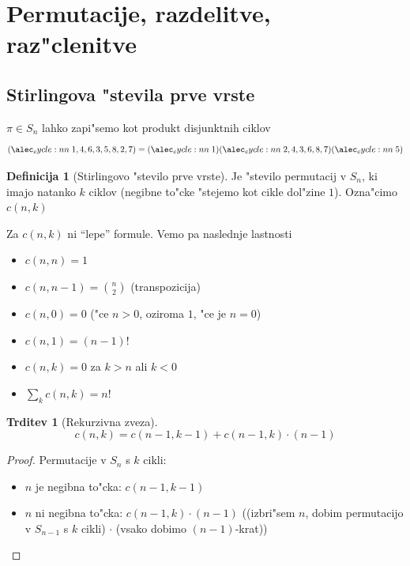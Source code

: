 \documentclass[a4paper,12pt]{article}
\theoremstyle{definition}
\newtheorem{defn}[counter]{Definicija}
\newtheorem{claim}[counter]{Trditev}
\theoremstyle{remark}
\begin{document}
\section{Permutacije, razdelitve, raz"clenitve}
\subsection{Stirlingova "stevila prve vrste}
$\pi \in S_n$ lahko zapi"semo kot produkt disjunktnih ciklov
\[\cycle{1, 4, 6, 3, 5, 8, 2, 7} = \cycle{1}\cycle{2, 4, 3, 6, 8, 7}\cycle{5}\]

\begin{defn}[Stirlingovo "stevilo prve vrste]
	Je "stevilo permutacij v $S_n$, ki imajo natanko $k$ ciklov (negibne to"cke "stejemo kot cikle dol"zine $1$). Ozna"cimo $c(n, k)$
\end{defn}
Za $c(n, k)$ ni ``lepe'' formule. Vemo pa naslednje lastnosti
\begin{itemize}
	\item $c(n, n) = 1$
	\item $c (n, n-1) = \binom{n}{2}$ (transpozicija)
	\item $c(n, 0) = 0$ ("ce $n > 0$, oziroma $1$, "ce je $n = 0$)
	\item $c(n, 1) = (n-1)!$
	\item $c(n, k) = 0$ za $k > n$ ali $k < 0$
	\item $\sum_k c(n, k) = n!$
\end{itemize}

\begin{claim}[Rekurzivna zveza]
	\[c(n, k) = c(n-1, k-1) + c(n-1, k)\cdot(n-1)\]
\end{claim}

\begin{proof}
	Permutacije v $S_n$ s $k$ cikli:
	\begin{itemize}
	    \item $n$ je negibna to"cka: $c(n-1, k-1)$
	    \item $n$ ni negibna to"cka: $c(n-1, k)  \cdot (n-1)$ ((izbri"sem $n$, dobim permutacijo v $S_{n-1}$ s $k$ cikli) $\cdot$ (vsako dobimo $(n-1)$-krat))
	\end{itemize}
\end{proof}
\end{document}

